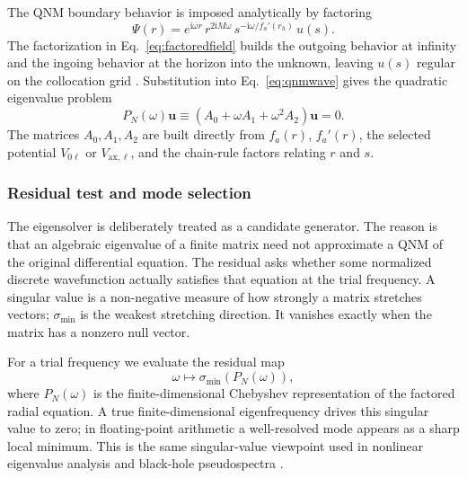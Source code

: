 \documentclass[12pt,a4paper]{article}
\newcommand{\ii}{\mathrm{i}}
\begin{document}
The QNM boundary behavior is imposed analytically by factoring
\begin{equation}
\Psi(r)=
e^{\ii\omega r}\,
r^{2\ii M\omega}\,
s^{-\ii\omega/f_a'(r_h)}\,u(s).
\label{eq:factoredfield}
\end{equation}
\color{blue}
The factorization in Eq.~\eqref{eq:factoredfield} builds the outgoing behavior
at infinity and the ingoing behavior at the horizon into the unknown, leaving
\(u(s)\) regular on the collocation grid \cite{Leaver1985,Jansen2017}.
Substitution into Eq.~\eqref{eq:qnmwave} gives the quadratic eigenvalue problem
\color{black}
\begin{equation}
P_N(\omega)\bm{u}
\equiv
\left(A_0+\omega A_1+\omega^2A_2\right)\bm{u}=0.
\label{eq:polynomialproblem}
\end{equation}
\color{blue}
The matrices \(A_0,A_1,A_2\) are built directly from \(f_a(r)\), \(f_a'(r)\), the selected potential \(V_{0\ell}\) or \(V_{\mathrm{ax},\ell}\), and the chain-rule factors relating \(r\) and \(s\).
\color{black}

\color{blue}
\subsubsection{Residual test and mode selection}
\color{black}

\color{blue}
The eigensolver is deliberately treated as a candidate generator.  The reason
is that an algebraic eigenvalue of a finite matrix need not approximate a QNM
of the original differential equation.  The residual asks whether some
normalized discrete wavefunction actually satisfies that equation at the
trial frequency.  A singular value is a non-negative measure of how strongly
a matrix stretches vectors; \(\sigma_{\min}\) is the weakest stretching
direction.  It vanishes exactly when the matrix has a nonzero null vector.

For a trial frequency we evaluate the residual map
\color{black}
\begin{equation*}
\omega \mapsto \sigma_{\min}\!\left(P_N(\omega)\right),
\end{equation*}
\color{blue}
where \(P_N(\omega)\) is the finite-dimensional Chebyshev representation of
the factored radial equation. A true finite-dimensional eigenfrequency drives
this singular value to zero; in floating-point arithmetic a well-resolved mode
appears as a sharp local minimum. This is the same singular-value viewpoint
used in nonlinear eigenvalue analysis and black-hole pseudospectra
\cite{Sadkane2023,Jaramillo2021,Cao2024}.
\color{black}
\end{document}
